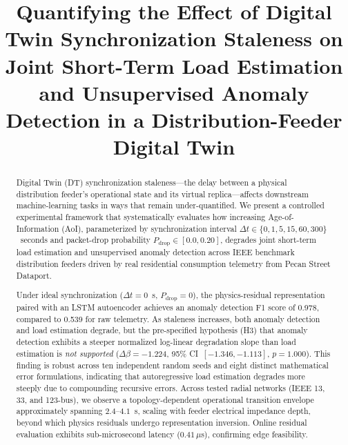 \documentclass[journal]{IEEEtran}
\newcommand{\dtsync}{\Delta t}
\newcommand{\pdrop}{P_{\mathrm{drop}}}
\newcommand{\dbeta}{\Delta\beta}
\begin{document}
\title{Quantifying the Effect of Digital Twin Synchronization Staleness on Joint Short-Term Load Estimation and Unsupervised Anomaly Detection in a Distribution-Feeder Digital Twin}


\maketitle

\begin{abstract}
Digital Twin (DT) synchronization staleness---the delay between a physical distribution feeder's operational state and its virtual replica---affects downstream machine-learning tasks in ways that remain under-quantified. We present a controlled experimental framework that systematically evaluates how increasing Age-of-Information (AoI), parameterized by synchronization interval $\dtsync \in \{0, 1, 5, 15, 60, 300\}$~seconds and packet-drop probability $\pdrop \in [0.0, 0.20]$, degrades joint short-term load estimation and unsupervised anomaly detection across IEEE benchmark distribution feeders driven by real residential consumption telemetry from Pecan Street Dataport.

Under ideal synchronization ($\dtsync = 0$~s, $\pdrop = 0$), the physics-residual representation paired with an LSTM autoencoder achieves an anomaly detection F1 score of 0.978, compared to 0.539 for raw telemetry. As staleness increases, both anomaly detection and load estimation degrade, but the pre-specified hypothesis (H3) that anomaly detection exhibits a steeper normalized log-linear degradation slope than load estimation is \emph{not supported} ($\dbeta = -1.224$, 95\% CI~$[-1.346, -1.113]$, $p = 1.000$). This finding is robust across ten independent random seeds and eight distinct mathematical error formulations, indicating that autoregressive load estimation degrades more steeply due to compounding recursive errors. Across tested radial networks (IEEE 13, 33, and 123-bus), we observe a topology-dependent operational transition envelope approximately spanning $2.4$--$4.1$~s, scaling with feeder electrical impedance depth, beyond which physics residuals undergo representation inversion. Online residual evaluation exhibits sub-microsecond latency ($0.41\,\mu$s), confirming edge feasibility.
\end{abstract}
\end{document}

